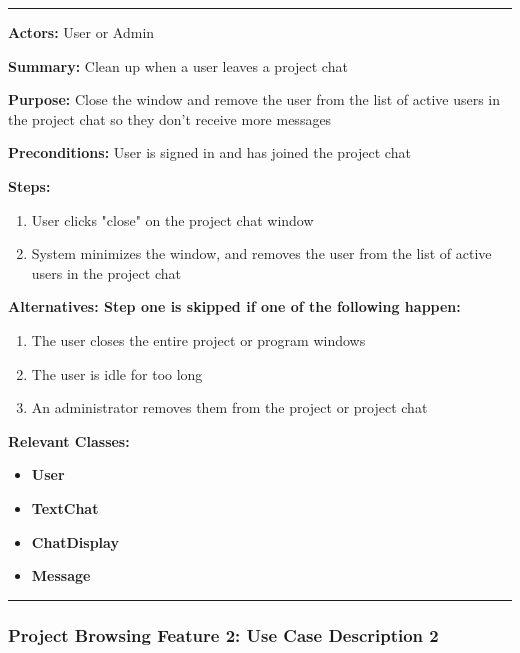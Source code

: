 \documentclass[twoside,letterpaper]{article}
\begin{document}
\vspace{2pt}
\hrule
\vspace{8pt}
\textbf{Actors:} User or Admin \newline

\noindent\textbf{Summary:} Clean up when a user leaves a project chat \newline

\noindent\textbf{Purpose:} Close the window and remove the user from the list of active users in the project chat so they don't receive more messages \newline

\noindent\textbf{Preconditions:} User is signed in and has joined the project chat \newline

\noindent\textbf{Steps:} \begin{enumerate}
	\item User clicks "close" on the project chat window
	\item System minimizes the window, and removes the user from the list of active users in the project chat
\end{enumerate}
\noindent\textbf{Alternatives: Step one is skipped if one of the following happen: }
\begin{enumerate}
	\item The user closes the entire project or program windows
	\item The user is idle for too long
	\item An administrator removes them from the project or project chat
\end{enumerate}


\noindent\textbf{Relevant Classes:}
\begin{itemize}
	\item \textbf{User}
	\item \textbf{TextChat}
	\item \textbf{ChatDisplay}
	\item \textbf{Message}
\end{itemize}
\hrule
\newpage


\subsubsection[Project Browsing Feature 2: Use Case Description 2]{\rmfamily\bfseries\color{black}
	Project Browsing Feature 2: Use Case Description 2}
\hypertarget{RefHeading22059017292}{}
\bigskip
\end{document}
